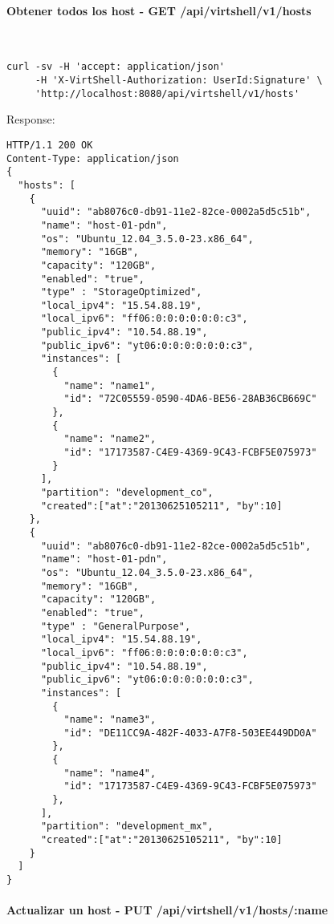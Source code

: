 \paragraph{Obtener todos los host - GET /api/virtshell/v1/hosts} ~\\

\begin{lstlisting}[style=json]
curl -sv -H 'accept: application/json' 
     -H 'X-VirtShell-Authorization: UserId:Signature' \ 
     'http://localhost:8080/api/virtshell/v1/hosts'
\end{lstlisting}

Response:

\begin{lstlisting}[style=json]
HTTP/1.1 200 OK
Content-Type: application/json
{
  "hosts": [
    {
      "uuid": "ab8076c0-db91-11e2-82ce-0002a5d5c51b",
      "name": "host-01-pdn",
      "os": "Ubuntu_12.04_3.5.0-23.x86_64",
      "memory": "16GB",
      "capacity": "120GB",
      "enabled": "true",
      "type" : "StorageOptimized",
      "local_ipv4": "15.54.88.19",
      "local_ipv6": "ff06:0:0:0:0:0:0:c3",
      "public_ipv4": "10.54.88.19",
      "public_ipv6": "yt06:0:0:0:0:0:0:c3",
      "instances": [
        {
          "name": "name1",
          "id": "72C05559-0590-4DA6-BE56-28AB36CB669C"
        },
        {
          "name": "name2",
          "id": "17173587-C4E9-4369-9C43-FCBF5E075973"
        }
      ],
      "partition": "development_co",
      "created":["at":"20130625105211", "by":10]
    },
    {
      "uuid": "ab8076c0-db91-11e2-82ce-0002a5d5c51b",
      "name": "host-01-pdn",
      "os": "Ubuntu_12.04_3.5.0-23.x86_64",
      "memory": "16GB",
      "capacity": "120GB",
      "enabled": "true",
      "type" : "GeneralPurpose",
      "local_ipv4": "15.54.88.19",
      "local_ipv6": "ff06:0:0:0:0:0:0:c3",
      "public_ipv4": "10.54.88.19",
      "public_ipv6": "yt06:0:0:0:0:0:0:c3",
      "instances": [
        {
          "name": "name3",
          "id": "DE11CC9A-482F-4033-A7F8-503EE449DD0A"
        },
        {
          "name": "name4",
          "id": "17173587-C4E9-4369-9C43-FCBF5E075973"
        },    
      ],
      "partition": "development_mx",
      "created":["at":"20130625105211", "by":10]
    }
  ]
}   
\end{lstlisting}

\paragraph{Actualizar un host - PUT /api/virtshell/v1/hosts/:name} ~\\


